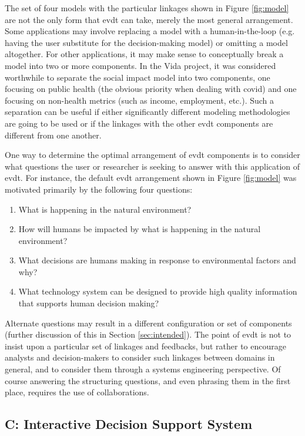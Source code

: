 The set of four models with the particular linkages shown in Figure \ref{fig:model} are not the only form that \ac{evdt} can take, merely the most general arrangement. Some applications may involve replacing a model with a human-in-the-loop (e.g. having the user substitute for the decision-making model) or omitting a model altogether. For other applications, it may make sense to conceptually break a model into two or more components. In the Vida project, it was considered worthwhile to separate the social impact model into two components, one focusing on public health (the obvious priority when dealing with \ac{covid}) and one focusing on non-health metrics (such as income, employment, etc.). Such a separation can be useful if either significantly different modeling methodologies are going to be used or if the linkages with the other \ac{evdt} components are different from one another. 

One way to determine the optimal arrangement of \ac{evdt} components is to consider what questions the user or researcher is seeking to answer with this application of \ac{evdt}. For instance, the default \ac{evdt} arrangement shown in Figure \ref{fig:model} was motivated primarily by the following four questions:

\begin{enumerate} \setlength{\itemsep}{0pt} \setlength{\parskip}{0pt}
    \item What is happening in the natural environment?
    \item How will humans be impacted by what is happening in the natural environment?
    \item What decisions are humans making in response to environmental factors and why?
    \item What technology system can be designed to provide high quality information that supports human decision making?
\end{enumerate}

Alternate questions may result in a different configuration or set of components (further discussion of this in Section \ref{sec:intended}). The point of \ac{evdt} is not to insist upon a particular set of linkages and feedbacks, but rather to encourage analysts and decision-makers to consider such linkages between domains in general, and to consider them through a systems engineering perspective. Of course answering the structuring questions, and even phrasing them in the first place, requires the use of collaborations.

\subsection{C: Interactive Decision Support System} \label{sec:dss}

